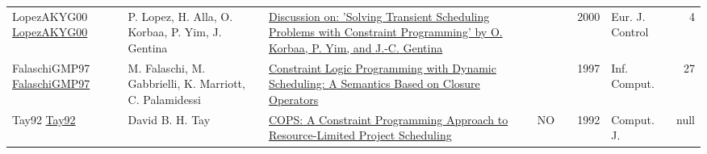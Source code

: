{\begin{longtable}{p{3cm}p{6cm}p{7cm}rrrp{3cm}r}
LopezAKYG00 \href{https://doi.org/10.1016/S0947-3580(00)71114-9}{LopezAKYG00} & P. Lopez, H. Alla, O. Korbaa, P. Yim, J. Gentina & \href{articles/LopezAKYG00.pdf}{Discussion on: 'Solving Transient Scheduling Problems with Constraint Programming' by O. Korbaa, P. Yim, and {J.-C.} Gentina} &  & \cite{LopezAKYG00} & 2000 & Eur. J. Control & 4\\
FalaschiGMP97 \href{https://doi.org/10.1006/inco.1997.2638}{FalaschiGMP97} & M. Falaschi, M. Gabbrielli, K. Marriott, C. Palamidessi & \href{articles/FalaschiGMP97.pdf}{Constraint Logic Programming with Dynamic Scheduling: {A} Semantics Based on Closure Operators} &  & \cite{FalaschiGMP97} & 1997 & Inf. Comput. & 27\\
Tay92 \href{}{Tay92} & David B. H. Tay & \href{articles/Tay92.pdf}{{COPS:} {A} Constraint Programming Approach to Resource-Limited Project Scheduling} & NO & \cite{Tay92} & 1992 & Comput. J. & null\\
\end{longtable}
}

